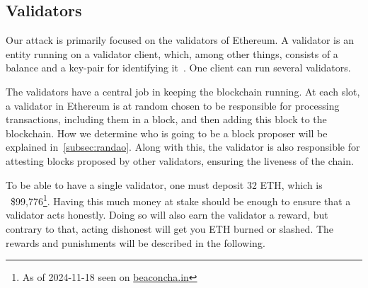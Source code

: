 %
%

\subsection{Validators}\label{subsec:validator}
Our attack is primarily focused on the validators of Ethereum.
A validator is an entity running on a validator client,
which, among other things, consists of a balance and a key-pair for identifying it~\cite{Staking}.
One client can run several validators.

The validators have a central job in keeping the blockchain running.
At each slot, a validator in Ethereum is at random chosen to be responsible for processing transactions,
including them in a block,
and then adding this block to the blockchain.
How we determine who is going to be a block proposer will be explained in~\autoref{subsec:randao}.
Along with this, the validator is also responsible for attesting blocks proposed by other validators,
ensuring the liveness of the chain.

To be able to have a single validator, one must deposit 32 ETH,
which is ~\$99,776\footnote{As of 2024-11-18 seen on \href{https://beaconcha.in/}{beaconcha.in}}.
Having this much money at stake should be enough to ensure that a validator acts honestly.
Doing so will also earn the validator a reward, but contrary to that,
acting dishonest will get you ETH burned or slashed.
The rewards and punishments will be described in the following.
